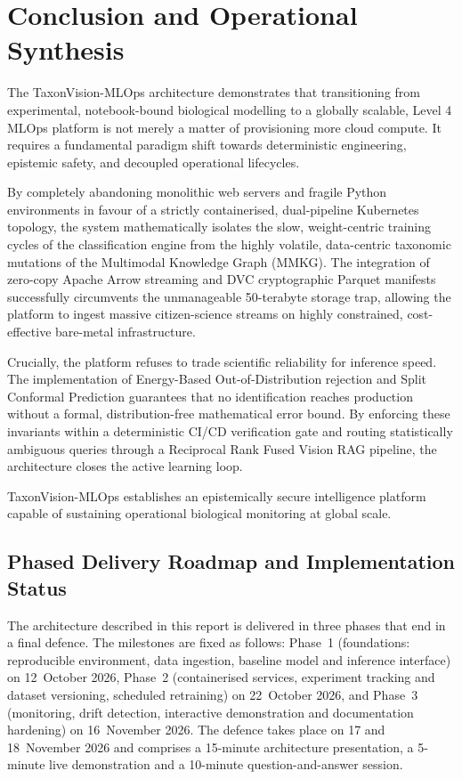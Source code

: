 \chapter{Conclusion and Operational Synthesis}
\label{ch:conclusion}

The TaxonVision-MLOps architecture demonstrates that transitioning from experimental, notebook-bound biological modelling to a globally scalable, Level 4 MLOps platform is not merely a matter of provisioning more cloud compute. It requires a fundamental paradigm shift towards deterministic engineering, epistemic safety, and decoupled operational lifecycles.

By completely abandoning monolithic web servers and fragile Python environments in favour of a strictly containerised, dual-pipeline Kubernetes topology, the system mathematically isolates the slow, weight-centric training cycles of the classification engine from the highly volatile, data-centric taxonomic mutations of the Multimodal Knowledge Graph (MMKG). The integration of zero-copy Apache Arrow streaming and DVC cryptographic Parquet manifests successfully circumvents the unmanageable 50-terabyte storage trap, allowing the platform to ingest massive citizen-science streams on highly constrained, cost-effective bare-metal infrastructure.

Crucially, the platform refuses to trade scientific reliability for inference speed. The implementation of Energy-Based Out-of-Distribution rejection and Split Conformal Prediction guarantees that no identification reaches production without a formal, distribution-free mathematical error bound. By enforcing these invariants within a deterministic CI/CD verification gate and routing statistically ambiguous queries through a Reciprocal Rank Fused Vision RAG pipeline, the architecture closes the active learning loop.

TaxonVision-MLOps establishes an epistemically secure intelligence platform capable of sustaining operational biological monitoring at global scale.

\section{Phased Delivery Roadmap and Implementation Status}
\label{sec:impl_status}

The architecture described in this report is delivered in three phases that end in a final defence. The milestones are fixed as follows: Phase~1 (foundations: reproducible environment, data ingestion, baseline model and inference interface) on 12~October 2026, Phase~2 (containerised services, experiment tracking and dataset versioning, scheduled retraining) on 22~October 2026, and Phase~3 (monitoring, drift detection, interactive demonstration and documentation hardening) on 16~November 2026. The defence takes place on 17 and 18~November 2026 and comprises a 15-minute architecture presentation, a 5-minute live demonstration and a 10-minute question-and-answer session.

